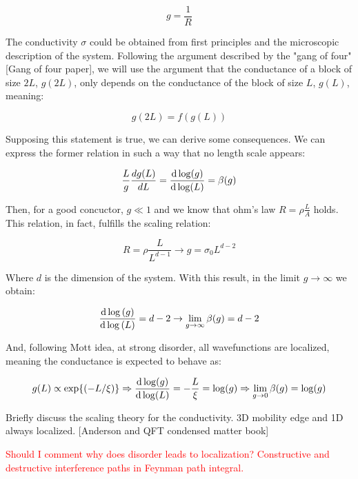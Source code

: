 \begin{equation}
    g=\frac{1}{R}
\end{equation}

The conductivity $\sigma$ could be obtained from first principles and the microscopic description of the system. Following the argument described by the "gang of four" [Gang of four paper], we will use the argument that the conductance of a block of size $2L$, $g(2L)$, only depends on the conductance of the block of size $L$, $g(L)$, meaning: 

\begin{equation}
    g(2L)=f(g(L))
\end{equation}

Supposing this statement is true, we can derive some consequences. We can express the former relation in such a way that no length scale appears:

\begin{equation}
    \frac{L}{g}\frac{dg(L)}{dL}=\dv{\log(g)}{\log(L)}=\beta (g)
\end{equation}

Then, for a good concuctor, $g\ll 1$ and we know that ohm's law $R=\rho \frac{L}{A}$ holds. This relation, in fact, fulfills the scaling relation:

\begin{equation}
    R=\rho \frac{L}{L^{d-1}}\to g = \sigma_0 L^{d-2}
\end{equation}

Where $d$ is the dimension of the system. With this result, in the limit $g\to \infty$ we obtain:

\begin{equation}
    \dv{\log{(g)}}{\log{(L)}}=d-2\to \lim_{g\to \infty} \beta(g)=d-2
\end{equation}

And, following Mott idea, at strong disorder, all wavefunctions are localized, meaning the conductance is expected to behave as:

\begin{equation}
    g(L)\propto \exp{(-L/\xi)}\Rightarrow \dv{\log(g)}{\log(L)}=-\frac{L}{\xi}=\log(g)\Rightarrow \lim_{g\to 0}\beta(g)=\log(g)
\end{equation}

Briefly discuss the scaling theory for the conductivity. 3D mobility edge and 1D always localized. [Anderson and QFT condensed matter book]

\textcolor{red}{Should I comment why does disorder leads to localization? Constructive and destructive interference paths in Feynman path integral.}

